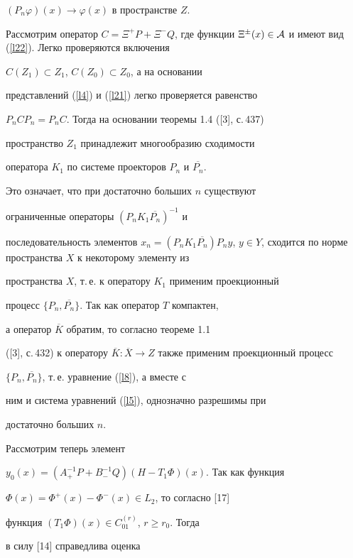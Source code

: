 $(P_n\varphi)(x)\rightarrow\varphi(x)$ в пространстве $Z$.


Рассмотрим оператор $C=\Xi^+P+\Xi^-Q$, где функции $\Xi^\pm(x) \in


{\cal A}$ и имеют вид (\ref{l22}). Легко проверяются включения


$C(Z_1)\subset Z_1$, $C(Z_0)\subset Z_0$, а на основании


представлений (\ref{l4}) и (\ref{l21}) легко проверяется равенство


$P_nCP_n=P_nC$. Тогда на основании теоремы 1.4 ([3], с.\,437)


пространство $Z_1$ принадлежит многообразию сходимости


оператора $K_1$ по системе проекторов $P_n$ и $\overline{P_n}$.


Это означает, что при достаточно больших $n$ существуют


ограниченные операторы $(P_nK_1\overline{P_n})^{-1}$ и


последовательность элементов $x_n=(P_nK_1\overline{P_n})P_ny$, $y


\in Y$, сходится по норме пространства $X$ к некоторому элементу из


пространства $X$, т.\,е. к оператору $K_1$ применим проекционный


процесс $\{P_n,\overline{P_n}\}$. Так как оператор $T$ компактен,


а оператор $\overline{K}$ обратим, то согласно теореме 1.1 


([3], с.\,432) к оператору $\overline{K}: 


\overline{X}\rightarrow Z$ также применим проекционный процесс


$\{P_n,\overline{P_n}\}$, т.\,е. уравнение (\ref{l8}), а вместе с


ним и система уравнений (\ref{l5}), однозначно разрешимы при


достаточно больших $n$. 





Рассмотрим теперь элемент


$y_0(x)=(A^{-1}_+P+B_-^{-1}Q)(H-T_1\Phi)(x)$. Так как функция


$\Phi(x)=\Phi^+(x)-\Phi^-(x) \in L_2$, то согласно [17]


функция $(T_1\Phi)(x) \in C_{01}^{(r)}$, $r\geqslant r_0$. Тогда


в силу [14] справедлива оценка


$$


